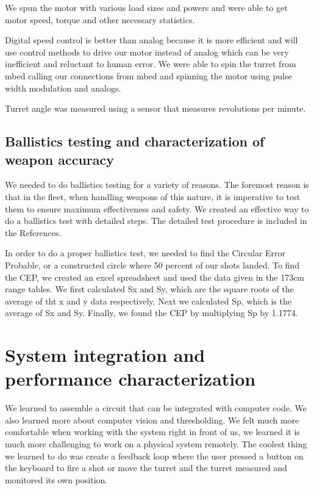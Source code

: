\documentclass{article}
\begin{document}
We spun the motor with various load sizes and powers and were able to get motor speed, torque and other necessary statistics.

Digital speed control is better than analog because it is more efficient and will use control methods to drive our motor instead of analog which can be very inefficient and reluctant to human error. We were able to spin the turret from mbed calling our connections from mbed and spinning the motor using pulse width modulation and analogs. 

Turret angle was measured using a sensor that measures revolutions per minute. 








\subsection{Ballistics testing and characterization of weapon accuracy}
We needed to do ballistics testing for a variety of reasons. The foremost reason is that in the fleet, when handling weapons of this nature, it is imperative to test them to ensure maximum effectiveness and safety. We created an effective way to do a ballistics test with detailed steps.
The detailed test procedure is included in the References.

In order to do a proper ballistics test, we needed to find the Circular Error Probable, or a constructed circle where 50 percent of our shots landed. To find the CEP, we created an excel spreadsheet and used the data given in the 173cm range tables. We first calculated Sx and Sy, which are the square roots of the average of tht x and y data respectively. Next we calculated Sp, which is the average of Sx and  Sy. Finally, we found the CEP by multiplying Sp by 1.1774.

\section{System integration and performance characterization}
We learned to assemble a circuit that can be integrated with computer code. We also learned more about computer vision and thresholding. We felt much more comfortable when working with the system right in front of us, we learned it is much more challenging to work on a physical system remotely. The coolest thing we learned to do was create a feedback loop where the user pressed a button on the keyboard to fire a shot or move the turret and the turret measured and monitored its own position.
\end{document}

